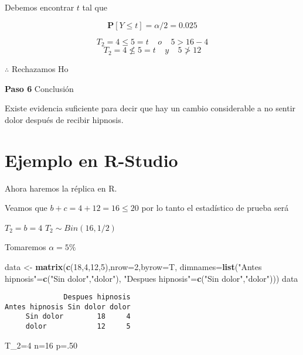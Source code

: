 \documentclass[a4paper,oneside,openany]{book}
\newenvironment{Shaded}{\begin{snugshade}}{\end{snugshade}}
\newcommand{\KeywordTok}[1]{\textcolor[rgb]{0.13,0.29,0.53}{\textbf{#1}}}
\newcommand{\DataTypeTok}[1]{\textcolor[rgb]{0.13,0.29,0.53}{#1}}
\newcommand{\DecValTok}[1]{\textcolor[rgb]{0.00,0.00,0.81}{#1}}
\newcommand{\StringTok}[1]{\textcolor[rgb]{0.31,0.60,0.02}{#1}}
\newcommand{\NormalTok}[1]{#1}
\begin{document}
Debemos encontrar \(t\) tal que

\[\mathbf{P}[Y \leq t]=\alpha/2=0.025\]

\[T_{2}=4 \leq 5=t  \ \ \ \ \   o  \ \ \ \ \      5>16-4  \]
\[T_{2}=4 \nleq 5=t   \ \ \ \ \   y   \ \ \ \ \      5\ngtr12\]

\(\therefore\) Rechazamos Ho

\textbf{Paso 6} Conclusión

Existe evidencia suficiente para decir que hay un cambio considerable a
no sentir dolor después de recibir hipnosis.

\section{Ejemplo en R-Studio}\label{ejemplo-en-r-studio-3}

Ahora haremos la réplica en R.

Veamos que \(b+c=4+12=16\leq 20\) por lo tanto el estadístico de prueba
será

\(T_2=b=4\) \(T_2\sim Bin(16,1/2)\)

Tomaremos \(\alpha=5\%\)

\begin{Shaded}
\begin{Highlighting}[]
\NormalTok{data <-}\StringTok{ }\KeywordTok{matrix}\NormalTok{(}\KeywordTok{c}\NormalTok{(}\DecValTok{18}\NormalTok{,}\DecValTok{4}\NormalTok{,}\DecValTok{12}\NormalTok{,}\DecValTok{5}\NormalTok{),}\DataTypeTok{nrow=}\DecValTok{2}\NormalTok{,}\DataTypeTok{byrow=}\NormalTok{T, }
       \DataTypeTok{dimnames=}\KeywordTok{list}\NormalTok{(}\StringTok{"Antes hipnosis"}\NormalTok{=}\KeywordTok{c}\NormalTok{(}\StringTok{"Sin dolor"}\NormalTok{,}\StringTok{"dolor"}\NormalTok{), }
       \StringTok{"Despues hipnosis"}\NormalTok{=}\KeywordTok{c}\NormalTok{(}\StringTok{"Sin dolor"}\NormalTok{,}\StringTok{"dolor"}\NormalTok{)))}
\NormalTok{data}
\end{Highlighting}
\end{Shaded}

\begin{verbatim}
              Despues hipnosis
Antes hipnosis Sin dolor dolor
     Sin dolor        18     4
     dolor            12     5
\end{verbatim}

\begin{Shaded}
\begin{Highlighting}[]
\NormalTok{T_}\DecValTok{2}\NormalTok{=}\DecValTok{4}
\NormalTok{n=}\DecValTok{16}
\NormalTok{p=.}\DecValTok{50}
\end{Highlighting}
\end{Shaded}
\end{document}
